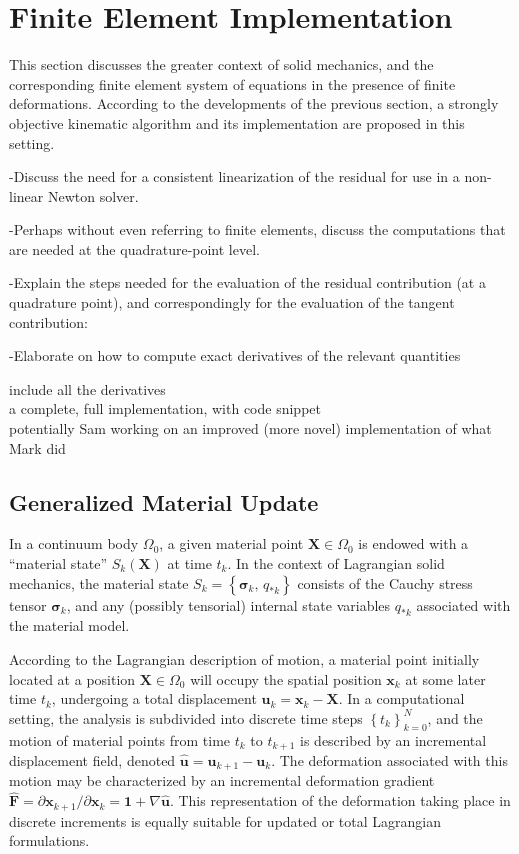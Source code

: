 \section{Finite Element Implementation}
%

This section discusses the greater context of solid mechanics, and the corresponding finite element system of equations in the presence of finite deformations. According to the developments of the previous section, a strongly objective kinematic algorithm and its implementation are proposed in this setting.

-Discuss the need for a consistent linearization of the residual for use in a non-linear Newton solver.

-Perhaps without even referring to finite elements, discuss the computations that are needed at the quadrature-point level.

-Explain the steps needed for the evaluation of the residual contribution (at a quadrature point), and correspondingly for the evaluation of the tangent contribution:

-Elaborate on how to compute exact derivatives of the relevant quantities

include all the derivatives\\
a complete, full implementation, with code snippet\\
potentially Sam working on an improved (more novel) implementation of what Mark did\\

\subsection{Generalized Material Update}

In a continuum body $\Omega_0$, a given material point $\mathbf{X} \in \Omega_0$ is endowed with a ``material state'' $S_k (\mathbf{X})$ at time $t_k$. In the context of Lagrangian solid mechanics, the material state $S_k = \left\{ \boldsymbol{\sigma}_{k}, \, q_{*k} \right\}$ consists of the Cauchy stress tensor $\boldsymbol{\sigma}_{k}$, and any (possibly tensorial) internal state variables $q_{*k}$ associated with the material model.

According to the Lagrangian description of motion, a material point initially located at a position $\mathbf{X} \in \Omega_0$ will occupy the spatial position $\mathbf{x}_k$ at some later time $t_k$, undergoing a total displacement $\mathbf{u}_k = \mathbf{x}_k - \mathbf{X}$. In a computational setting, the analysis is subdivided into discrete time steps $\left\{ t_k \right\}_{k=0}^N$, and the motion of material points from time $t_k$ to $t_{k+1}$ is described by an incremental displacement field, denoted $\hat{\mathbf{u}} = \mathbf{u}_{k+1} - \mathbf{u}_{k}$. The deformation associated with this motion may be characterized by an incremental deformation gradient $\hat{\mathbf{F}} = \partial \mathbf{x}_{k+1} / \partial \mathbf{x}_k = \mathbf{1} + \nabla \hat{\mathbf{u}}$. This representation of the deformation taking place in discrete increments is equally suitable for updated or total Lagrangian formulations.

